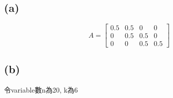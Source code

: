 \documentclass[12pt]{article}
\begin{document}
\section{}
    \subsection*{(a)}
    \[  A=
        \left[
        \begin{array}{cccc}
            0.5 & 0.5 & 0 & 0\\
            0 & 0.5 & 0.5 & 0\\
            0 & 0 & 0.5 & 0.5
        \end{array}
        \right]
    \]
    \subsection*{(b)}
        令variable數n為20, k為6
\end{document}
